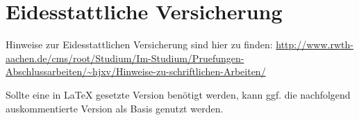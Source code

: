 \section{Eidesstattliche Versicherung}
Hinweise zur Eidesstattlichen Versicherung sind hier zu finden:
\url{http://www.rwth-aachen.de/cms/root/Studium/Im-Studium/Pruefungen-Abschlussarbeiten/~hjxv/Hinweise-zu-schriftlichen-Arbeiten/}

Sollte eine in \LaTeX{} gesetzte Version benötigt werden, kann ggf. die nachfolgend auskommentierte Version als Basis genutzt werden.

%
%
%
%
%

